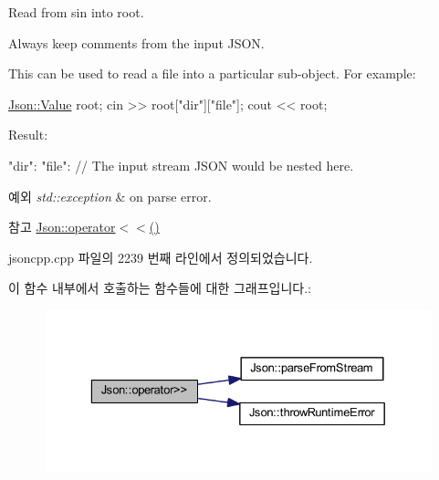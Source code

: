 Read from \textquotesingle{}sin\textquotesingle{} into \textquotesingle{}root\textquotesingle{}. 

Always keep comments from the input J\+S\+ON.

This can be used to read a file into a particular sub-\/object. For example\+: 
\begin{DoxyCode}
\hyperlink{class_json_1_1_value}{Json::Value} root;
cin >> root[\textcolor{stringliteral}{"dir"}][\textcolor{stringliteral}{"file"}];
cout << root;
\end{DoxyCode}
 Result\+: \begin{DoxyVerb}{
"dir": {
    "file": {
    // The input stream JSON would be nested here.
    }
}
}
\end{DoxyVerb}
 
\begin{DoxyExceptions}{예외}
{\em std\+::exception} & on parse error. \\
\hline
\end{DoxyExceptions}
\begin{DoxySeeAlso}{참고}
\hyperlink{namespace_json_a975d1dbca8aa7a06f38d373edcb9081c}{Json\+::operator$<$$<$()} 
\end{DoxySeeAlso}


jsoncpp.\+cpp 파일의 2239 번째 라인에서 정의되었습니다.


이 함수 내부에서 호출하는 함수들에 대한 그래프입니다.\+:\nopagebreak
\begin{figure}[H]
\begin{center}
\leavevmode
\includegraphics[width=329pt]{namespace_json_a244ed0996aba750c40c1641c06bba449_cgraph}
\end{center}
\end{figure}
\mbox{\label{namespace_json_aab0cf1ecf81d1aeca12be2a416a84352}} 
